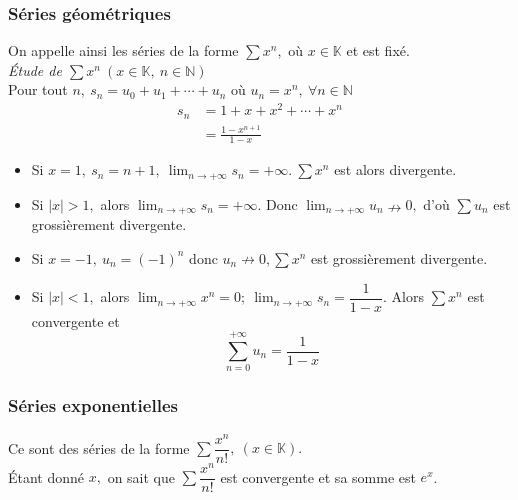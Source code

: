 \documentclass[11pt, a4paper]{book}
\begin{document}
\subsubsection{S\'eries g\'eom\'etriques}
On appelle ainsi les s\'eries de la forme $\sum x^{n},$ o\`u $x \in \mathbb{K}$ et est fix\'e.\\
\textit{\'Etude de $\sum x^{n}~(x\in \mathbb{K},~n\in \mathbb{N} )$}\\
Pour tout $n,~s_{n}=u_{0}+u_{1}+\cdots +u_{n}$ o\`u $u_{n}=x^{n},~\forall n\in \mathbb{N}$\\
\begin{align*} s_{n} & =1+x+x^{2}+\cdots +x^{n}\\
& =\frac{1-x^{n+1}}{1-x} \end{align*}
\begin{itemize}
\item Si $x=1,~s_{n}=n+1,~ {\displaystyle \lim_{n \rightarrow +\infty} s_{n}=+\infty.~\sum x^{n} }$ est alors divergente.
\item Si $|x|>1,$ alors ${\displaystyle\lim_{n \rightarrow +\infty}s_{n}=+\infty}.$ Donc ${\displaystyle \lim_{n \rightarrow +\infty}u_{n}\nrightarrow 0},$ d'o\`u $\sum u_{n}$ est grossi\`erement divergente.
\item Si $x=-1,~u_{n}=(-1)^{n}$ donc $u_{n} \nrightarrow 0, \sum x^{n}$ est grossi\`erement divergente.
\item Si $|x|<1,$ alors ${\displaystyle \lim_{n\rightarrow +\infty}x^{n}=0;~ \lim_{n\rightarrow +\infty}s_{n}=\dfrac{1}{1-x}}.$ Alors $\sum x^{n}$ est convergente et $$\sum_{n=0}^{+\infty}u_{n}=\dfrac{1}{1-x}$$
\end{itemize}

\subsubsection{S\'eries exponentielles}
Ce sont des s\'eries de la forme $\sum \dfrac{x^{n}}{n!},~ (x\in \mathbb{K}).$\\
\'Etant donn\'e $x,$ on sait que $\sum \dfrac{x^{n}}{n!}$ est convergente et sa somme est $ e^ x$.
\end{document}
